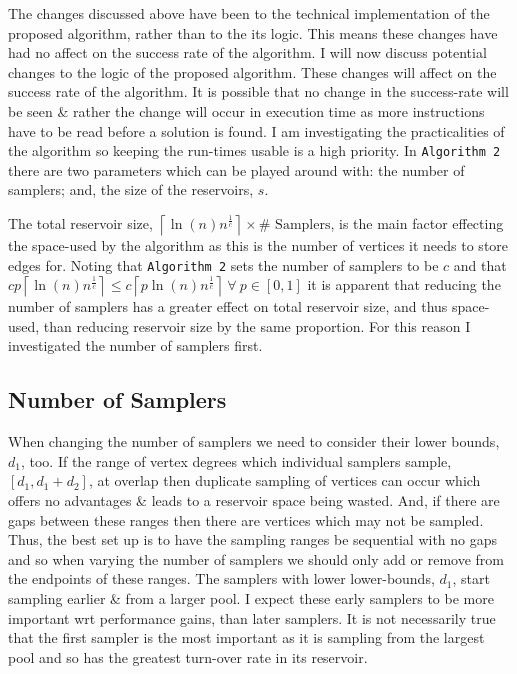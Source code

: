 \documentclass[11pt,twoside,a4paper]{report}
\begin{document}
\par The changes discussed above have been to the technical implementation of the proposed algorithm, rather than to the its logic. This means these changes have had no affect on the success rate of the algorithm. I will now discuss potential changes to the logic of the proposed algorithm. These changes will affect on the success rate of the algorithm. It is possible that no change in the success-rate will be seen \& rather the change will occur in execution time as more instructions have to be read before a solution is found. I am investigating the practicalities of the algorithm so keeping the run-times usable is a high priority. In \texttt{Algorithm 2} there are two parameters which can be played around with: the number of samplers; and, the size of the reservoirs, $s$.

\par The total reservoir size, $\left\lceil\ln(n)n^{\frac1c}\right\rceil\times\text{\#\ Samplers}$, is the main factor effecting the space-used by the algorithm as this is the number of vertices it needs to store edges for. Noting that \texttt{Algorithm 2} sets the number of samplers to be $c$ and that $cp\left\lceil\ln(n)n^{\frac1c}\right\rceil\leq c\left\lceil p\ln(n)n^{\frac1c}\right\rceil\ \forall\ p\in[0,1]$ it is apparent that reducing the number of samplers has a greater effect on total reservoir size, and thus space-used, than reducing reservoir size by the same proportion. For this reason I investigated the number of samplers first.

\subsection{Number of Samplers}

\par When changing the number of samplers we need to consider their lower bounds, $d_1$, too. If the range of vertex degrees which individual samplers sample, $[d_1,d_1+d_2]$, at overlap then duplicate sampling of vertices can occur which offers no advantages \& leads to a reservoir space being wasted. And, if there are gaps between these ranges then there are vertices which may not be sampled. %
Thus, the best set up is to have the sampling ranges be sequential with no gaps and so when varying the number of samplers we should only add or remove from the endpoints of these ranges. The samplers with lower lower-bounds, $d_1$, start sampling earlier \& from a larger pool. I expect these early samplers to be more important wrt performance gains, than later samplers. It is not necessarily true that the first sampler is the most important as it is sampling from the largest pool and so has the greatest turn-over rate in its reservoir.
\end{document}
